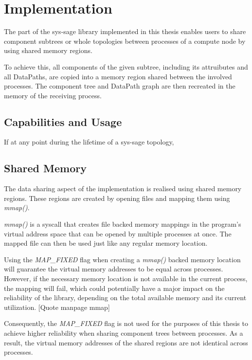 
\chapter{Implementation}\label{chapter:Implementation}

The part of the sys-sage library implemented in this thesis enables users to share component subtrees or whole topologies between processes of a compute node by using shared memory regions.

To achieve this, all components of the given subtree, including its attruibutes and all DataPaths, are copied into a memory region shared between the involved processes.
The component tree and DataPath graph are then recreated in the memory of the receiving process.

\section{Capabilities and Usage}
If at any point during the lifetime of a sys-sage topology,

\section{Shared Memory}
The data sharing aspect of the implementation is realised using shared memory regions. These regions are created by opening files and mapping them using \emph{mmap()}. %

\emph{mmap()} is a syscall that creates file backed memory mappings in the program's virtual address space that can be opened by multiple processes at once.
The mapped file can then be used just like any regular memory location. \cite{crotty22-mmap}

Using the \emph{MAP\_FIXED} flag when creating a \emph{mmap()} backed memory location will guarantee the virtual memory addresses to be equal across processes.
However, if the necessary memory location is not available in the current process, the mapping will fail, which could potentially have a major impact on the reliability of the library,
depending on the total available memory and its current utilization. [Quote manpage mmap] %

Consequently, the \emph{MAP\_FIXED} flag is not used for the purposes of this thesis to achieve higher reliability when sharing component trees between processes.
As a result, the virtual memory addresses of the shared regions are not identical across processes.

